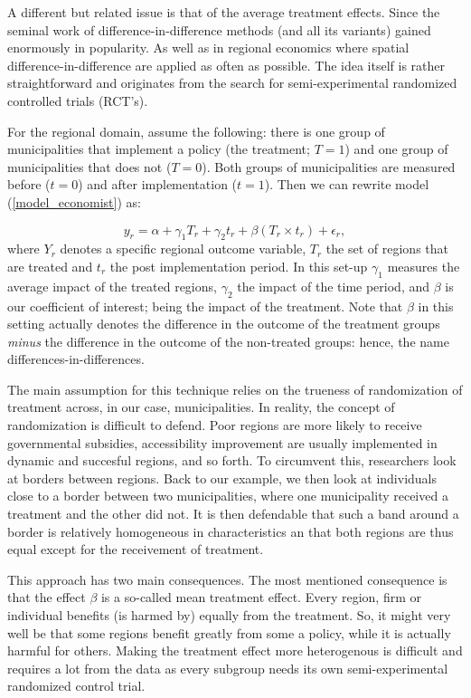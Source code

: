 \documentclass[fleqn,10pt]{SelfArx} %
\begin{document}
A different but related issue is that of the average treatment effects. Since
the seminal work of \citet{angrist2008mostly} difference-in-difference methods
(and all its variants) gained enormously in popularity. As well as in regional
economics where spatial difference-in-difference are applied as often as
possible. The idea itself is rather straightforward and originates from the
search for semi-experimental randomized controlled trials (RCT's). 

For the regional domain, assume the following: there is one group of
municipalities that implement a policy (the treatment; $T = 1$) and one group of municipalities that does
not ($T = 0$). Both groups of municipalities are measured before ($t = 0$) and after
implementation ($t=1$).
Then we can rewrite model (\ref{model_economist}) as:

\begin{equation}
  \label{eq:diff}
  y_r = \alpha + \gamma_1 T_r + \gamma_2 t_r+ \beta (T_r \times t_r) + \epsilon_r,  
\end{equation}
where $Y_r$ denotes a specific regional outcome variable, $T_r$ the set of
regions that are treated and $t_r$ the post implementation period. In this
set-up $\gamma_1$ measures the average impact of the treated regions, $\gamma_2$
the impact of the time period, and $\beta$ is our coefficient of interest; being
the impact of the treatment. Note that $\beta$ in this setting actually denotes
the difference in the outcome of the treatment groups \emph{minus} the
difference in the outcome of the non-treated groups: hence, the name
differences-in-differences.

The main assumption for this technique relies on the trueness of randomization of treatment
across, in our case, municipalities. In reality, the concept of randomization is
difficult to defend. Poor regions are more likely to receive governmental
subsidies, accessibility improvement are usually implemented in dynamic and
succesful regions, and so forth. To circumvent this, researchers look at borders
between regions. Back to our example, we then look at individuals close to a
border between two municipalities, where one municipality received a treatment
and the other did not. It is then defendable that such a band around a border is
relatively homogeneous in characteristics an that both regions are thus equal
except for the receivement of treatment.  

This approach has two main consequences. The most mentioned consequence is that
the effect $\beta$ is a so-called mean treatment effect. Every region, firm or
individual benefits (is harmed by) equally from the treatment. So, it might very
well be that some regions benefit greatly from some a policy, while it is
actually harmful for others. Making the treatment effect more heterogenous is
difficult and requires a lot from the data as every subgroup needs its own
semi-experimental randomized control trial.
\end{document}
